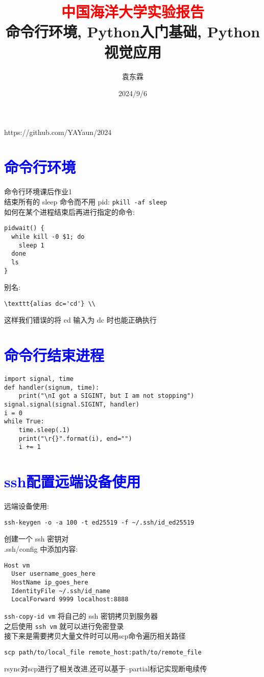 \documentclass{article}
\begin{document}
  
\title{\textcolor{red}{中国海洋大学实验报告}\\命令行环境, Python入门基础, Python视觉应用}  
\author{袁东霖}  
\date{2024/9/6}  
\maketitle  
https://github.com/YAYaun/2024 \\
\section{\textcolor{blue}{命令行环境}}  
命令行环境课后作业1 \\  
结束所有的 sleep 命令而不用 pid: \texttt{pkill -af sleep} \\  
如何在某个进程结束后再进行指定的命令:  
\begin{lstlisting}  
pidwait() {    
  while kill -0 $1; do  
    sleep 1    
  done    
  ls    
}  
\end{lstlisting}  
别名: \\  
\begin{lstlisting}
\texttt{alias dc='cd'} \\
\end{lstlisting}  
这样我们错误的将 cd 输入为 dc 时也能正确执行 \\  
\section{\textcolor{blue}{命令行结束进程}}
\begin{lstlisting}
import signal, time
def handler(signum, time):
    print("\nI got a SIGINT, but I am not stopping")
signal.signal(signal.SIGINT, handler)
i = 0
while True:
    time.sleep(.1)
    print("\r{}".format(i), end="")
    i += 1
\end{lstlisting}
\section{\textcolor{blue}{ssh配置远端设备使用}}
远端设备使用:  
\begin{lstlisting}  
ssh-keygen -o -a 100 -t ed25519 -f ~/.ssh/id_ed25519
\end{lstlisting}  
创建一个 ssh 密钥对 \\  
.ssh/config 中添加内容:  
\begin{lstlisting}  
Host vm  
  User username_goes_here  
  HostName ip_goes_here  
  IdentityFile ~/.ssh/id_name  
  LocalForward 9999 localhost:8888  
\end{lstlisting}  
\texttt{ssh-copy-id vm} 将自己的 ssh 密钥拷贝到服务器 \\  
之后使用 \texttt{ssh vm} 就可以进行免密登录  
\\ 接下来是需要拷贝大量文件时可以用scp命令遍历相关路径
\begin{lstlisting}
scp path/to/local_file remote_host:path/to/remote_file
\end{lstlisting}
rsync对scp进行了相关改进,还可以基于--partial标记实现断电续传
\end{document}

